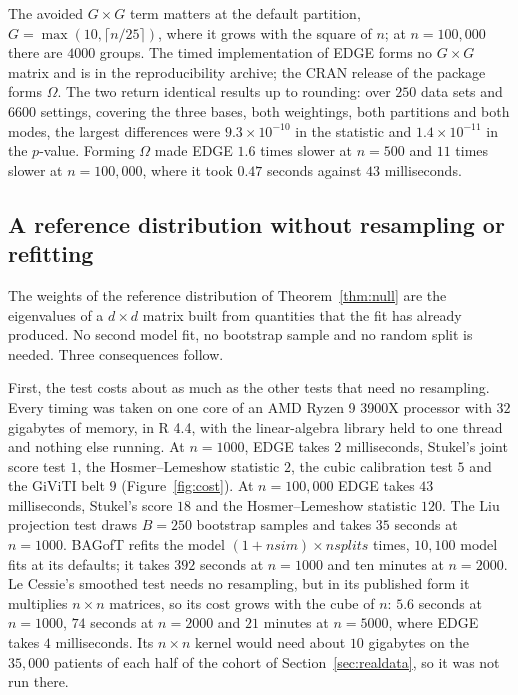 The avoided $G\times G$ term matters at the default partition, $G=\max(10,\lceil n/25\rceil)$, where it
grows with the square of $n$; at $n=100{,}000$ there are $4000$ groups. The timed implementation of
EDGE forms no $G\times G$ matrix and is in the reproducibility archive; the CRAN release of the package
forms $\Omega$. The two return identical results up to rounding: over $250$ data sets and $6600$ settings, covering
the three bases, both weightings, both partitions and both modes, the largest differences were
$9.3\times10^{-10}$ in the statistic and $1.4\times10^{-11}$ in the $p$-value. Forming $\Omega$ made
EDGE $1.6$ times slower at $n=500$ and $11$ times slower at $n=100{,}000$, where it took $0.47$ seconds
against $43$ milliseconds.

\subsection{A reference distribution without resampling or refitting}\label{sec:noresampling}

The weights of the reference distribution of Theorem~\ref{thm:null} are the eigenvalues of a $d\times
d$ matrix built from quantities that the fit has already produced. No second model fit, no bootstrap
sample and no random split is needed. Three consequences follow.

First, the test costs about as much as the other tests that need no resampling. Every timing was taken on one
core of an AMD Ryzen 9 3900X processor with $32$ gigabytes of memory, in R 4.4, with the linear-algebra
library held to one thread and nothing else running. At $n=1000$, EDGE takes $2$ milliseconds, Stukel's joint
score test $1$, the Hosmer--Lemeshow statistic $2$, the cubic calibration test $5$ and the GiViTI belt
$9$ (Figure~\ref{fig:cost}). At $n=100{,}000$ EDGE takes $43$ milliseconds, Stukel's score $18$ and the
Hosmer--Lemeshow statistic $120$. The Liu projection test draws $B=250$ bootstrap samples and takes
$35$ seconds at $n=1000$. BAGofT refits the model $(1+\textit{nsim})\times\textit{nsplits}$ times,
$10{,}100$ model fits at its defaults; it takes $392$ seconds at $n=1000$ and ten minutes at $n=2000$.
Le Cessie's smoothed test needs no resampling, but in its published form it multiplies $n\times n$
matrices, so its cost grows with the cube of $n$: $5.6$ seconds at $n=1000$, $74$ seconds at $n=2000$
and $21$ minutes at $n=5000$, where EDGE takes $4$ milliseconds. Its $n\times n$ kernel would need about
$10$ gigabytes on the $35{,}000$ patients of each half of the cohort of Section~\ref{sec:realdata}, so
it was not run there.

